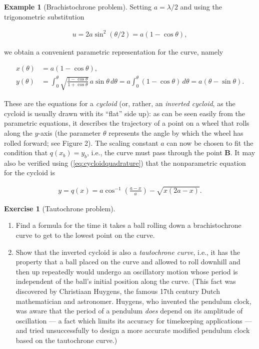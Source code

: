 \documentclass[11pt]{report}
\theoremstyle{plain}
\theoremstyle{definition}
\newtheorem{example}[thm]{Example}
\newtheorem{xexercise}[thm]{Exercise}
\begin{document}
\begin{example}[Brachistochrone problem]
Setting $a=\lambda/2$ and using the trigonometric
substitution

\begin{align*}
u = 2a \sin^2(\theta/2) = a(1-\cos \theta),
\end{align*}

we obtain a convenient parametric representation for
the curve, namely

\begin{align*}
x(\theta) &= a(1-\cos \theta), \\
y(\theta) &= \int_0^\theta \sqrt{\frac{1-\cos\theta}{1+\cos\theta}}\,a\sin \theta\,d\theta
= a\int_0^\theta (1-\cos\theta)\,d\theta = a(\theta-\sin\theta).
\end{align*}

These are the equations for a \emph{cycloid} (or, rather,
an \emph{inverted cycloid}, as the cycloid is usually drawn
with its ``flat'' side up): as can be seen easily from
the parametric equations, it describes the trajectory
of a point on a wheel that rolls along the $y$-axis
(the parameter $\theta$ represents the angle by which
the wheel has rolled forward; see Figure 2). The
scaling constant $a$ can now be chosen to fit the
condition that $q(x_b)=y_b$, i.e., the curve must
pass through the point $\mathbf{B}$. It may also be
verified using (\ref{eq:cycloidquadrature}) that the
nonparametric equation for the cycloid is

\begin{align*}
y = q(x) = a \cos^{-1}\left(\frac{a-x}{a}\right)-\sqrt{x(2a-x)}.
\end{align*}

\end{example}

\begin{xexercise}[Tautochrone problem]

\begin{enumerate}[label=\arabic*.]
\item Find a formula for the time it takes a ball rolling
down a brachistochrone curve to get to the lowest
point on the curve.

\item Show that the inverted cycloid is also a \emph{tautochrone
curve}, i.e., it has the property that a ball placed
on the curve and allowed to roll downhill and then up
repeatedly would undergo an oscillatory motion whose
period is independent of the ball's initial position
along the curve. (This fact was discovered by
Christiaan Huygens, the famous 17th century Dutch
mathematician and astronomer. Huygens, who invented
the pendulum clock, was aware that the period of a
pendulum \emph{does} depend on its amplitude of oscillation
--- a fact which limits its accuracy for timekeeping
applications --- and tried unsuccessfully to design a
more accurate modified pendulum clock based on the
tautochrone curve.)
\end{enumerate}

\end{xexercise}
\end{document}
